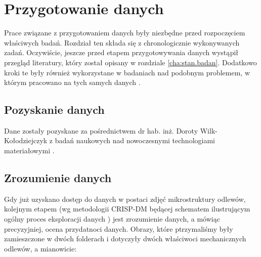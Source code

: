 \chapter{Przygotowanie danych}
\label{cha:przyg.danych}

Prace związane z przygotowaniem danych były niezbędne przed rozpoczęciem właściwych badań. Rozdział ten składa się z chronologicznie wykonywanych zadań. Oczywiście, jeszcze przed etapem przygotowywania danych wystąpił przegląd literatury, który został opisany w rozdziale \ref{cha:stan.badan}. Dodatkowo kroki te były również wykorzystane w badaniach nad podobnym problemem, w którym pracowano na tych samych danych \cite{Reczek21}.

\section{Pozyskanie danych}
\label{sec:pozyskanie_danych}

Dane zostały pozyskane za pośrednictwem dr hab. inż. Doroty Wilk-Kołodziejczyk z badań naukowych nad nowoczesnymi technologiami materiałowymi \cite{Pirowski17, specodlew}.

\section{Zrozumienie danych}
\label{sec:zrozumienie_danych}

Gdy już uzyskano dostęp do danych w postaci zdjęć mikrostruktury odlewów, kolejnym etapem (wg metodologii CRISP-DM będącej schematem ilustrującym ogólny proces eksploracji danych \cite{Watson00}) jest zrozumienie danych, a mówiąc precyzyjniej, ocena przydatnoci danych. 
Obrazy, które ptrzymaliśmy były zamieszczone w dwóch folderach i dotyczyły dwóch właściwoci mechanicznych odlewów, a mianowicie:

